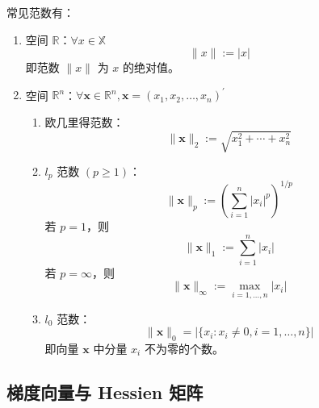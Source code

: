 \documentclass[cn]{elegantbook}
\begin{document}
\begin{example}[常见范数]
    常见范数有：
    \begin{enumerate}
        \item 空间 $\mathbb{R}$：$\forall x\in\mathbb{X}$
              \begin{equation}
                  \|x\|:=|x|
              \end{equation}
              即范数 $\|x\|$ 为 $x$ 的绝对值。
        \item 空间 $\mathbb{R}^{n}$：$\forall\mathbf{x}\in\mathbb{R}^{n}, \mathbf{x}=(x_{1},x_{2},\ldots,x_{n})^{\prime}$
              \begin{enumerate}
                  \item 欧几里得范数：
                        \begin{equation}
                            \|\mathbf{x}\|_{2}:=\sqrt{x_{1}^{2}+\cdots+x_{n}^{2}}
                        \end{equation}
                  \item  $l_{p}$ 范数 $(p\geq 1)$：
                        \begin{equation}
                            \|\mathbf{x}\|_{p}:=\left(\sum_{i=1}^{n}\left|x_{i}\right|^{p}\right)^{1/p}
                        \end{equation}
                        若 $p=1$，则
                        \begin{equation}
                            \|\mathbf{x}\|_{1}:=\sum_{i=1}^{n}|x_{i}|
                        \end{equation}
                        若 $p=\infty$，则
                        \begin{equation}
                            \|\mathbf{x}\|_{\infty}:=\max_{i=1,\ldots,n}|x_{i}|
                        \end{equation}
                  \item  $l_{0}$ 范数：
                        \begin{equation}
                            \|\mathbf{x}\|_{0}=|\{x_{i}:x_{i}\neq 0,i=1,\ldots,n\}|
                        \end{equation}
                        即向量 $\mathbf{x}$ 中分量 $x_{i}$ 不为零的个数。
              \end{enumerate}
    \end{enumerate}
\end{example}

\subsection{梯度向量与 Hessien 矩阵}
\end{document}

